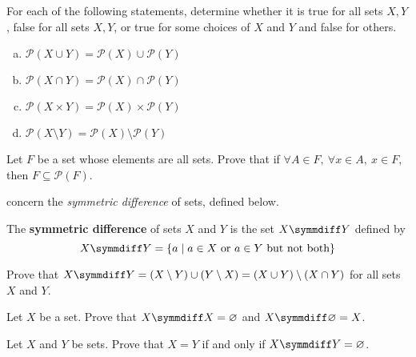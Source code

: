 \begin{chapex}
\label{cqPowerSetRespectSetOperations}
For each of the following statements, determine whether it is true for all sets $X,Y$, false for all sets $X,Y$, or true for some choices of $X$ and $Y$ and false for others.
\begin{multicols}{2}
\begin{enumerate}[(a)]
\item $\mathcal{P}(X \cup Y) = \mathcal{P}(X) \cup \mathcal{P}(Y)$
\item $\mathcal{P}(X \cap Y) = \mathcal{P}(X) \cap \mathcal{P}(Y)$
\item $\mathcal{P}(X \times Y) = \mathcal{P}(X) \times \mathcal{P}(Y)$
\item $\mathcal{P}(X \setminus Y) = \mathcal{P}(X) \setminus \mathcal{P}(Y)$
\end{enumerate}
\end{multicols}
\end{chapex}

\begin{chapex}
Let $F$ be a set whose elements are all sets. Prove that if $\forall A \in F,~ \forall x \in A,~ x \in F$, then $F \subseteq \mathcal{P}(F)$.
\end{chapex}

 concern the \textit{symmetric difference} of sets, defined below.

\begin{definition}
\label{defSymmetricDifference}
The \textbf{symmetric difference} of sets $X$ and $Y$ is the set $X \symmdiff Y$  defined by
\[ X \symmdiff Y = \{ a \mid a \in X \text{ or } a \in Y \text{ but not both} \} \]
\end{definition}

\begin{chapex}
\label{cqSymmetricDifferenceBegin}
Prove that $X \symmdiff Y = (X \setminus Y) \cup (Y \setminus X) = (X \cup Y) \setminus (X \cap Y)$ for all sets $X$ and $Y$.
\end{chapex}

\begin{chapex}
Let $X$ be a set. Prove that $X \symmdiff X = \varnothing$ and $X \symmdiff \varnothing = X$.
\end{chapex}

\begin{chapex}
Let $X$ and $Y$ be sets. Prove that $X = Y$ if and only if $X \symmdiff Y = \varnothing$.
\end{chapex}

